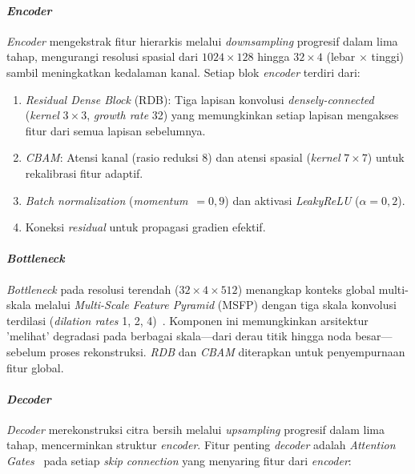 \paragraph{\textit{Encoder}}

\textit{Encoder} mengekstrak fitur hierarkis melalui \textit{downsampling} progresif dalam lima tahap, mengurangi resolusi spasial dari $1024 \times 128$ hingga $32 \times 4$ (lebar $\times$ tinggi) sambil meningkatkan kedalaman kanal. Setiap blok \textit{encoder} terdiri dari:
\begin{enumerate}[label=\alph*., leftmargin=1.5em, labelsep=0.5em, itemindent=0pt, noitemsep, topsep=0pt]
  \item \textit{Residual Dense Block} (RDB): Tiga lapisan konvolusi \textit{densely-connected} (\textit{kernel} $3 \times 3$, \textit{growth rate} 32) yang memungkinkan setiap lapisan mengakses fitur dari semua lapisan sebelumnya.
  \item \textit{CBAM}: Atensi kanal (rasio reduksi 8) dan atensi spasial (\textit{kernel} $7 \times 7$) untuk rekalibrasi fitur adaptif.
  \item \textit{Batch normalization} (\textit{momentum}~$=0,9$) dan aktivasi \textit{LeakyReLU} ($\alpha=0,2$).
  \item Koneksi \textit{residual} untuk propagasi gradien efektif.
\end{enumerate}

\paragraph{\textit{Bottleneck}}

\textit{Bottleneck} pada resolusi terendah ($32 \times 4 \times 512$) menangkap konteks global multi-skala melalui \textit{Multi-Scale Feature Pyramid} (MSFP) dengan tiga skala konvolusi terdilasi (\textit{dilation rates} 1, 2, 4)~\parencite{chen2017deeplab}. Komponen ini memungkinkan arsitektur 'melihat' degradasi pada berbagai skala---dari derau titik hingga noda besar---sebelum proses rekonstruksi. \textit{RDB} dan \textit{CBAM} diterapkan untuk penyempurnaan fitur global.

\paragraph{\textit{Decoder}}

\textit{Decoder} merekonstruksi citra bersih melalui \textit{upsampling} progresif dalam lima tahap, mencerminkan struktur \textit{encoder}. Fitur penting \textit{decoder} adalah \textit{Attention Gates}~\parencite{oktay2018attention} pada setiap \textit{skip connection} yang menyaring fitur dari \textit{encoder}:

